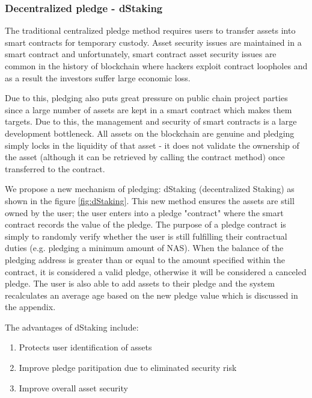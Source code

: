 \subsubsection{Decentralized pledge - dStaking}
The traditional centralized pledge method requires users to transfer assets into smart contracts for temporary custody. Asset security issues are maintained in a smart contract and unfortunately, smart contract asset security issues are common in the history of blockchain where hackers exploit contract loopholes and as a result the investors suffer large economic loss. 

Due to this, pledging also puts great pressure on public chain project parties since a large number of assets are kept in a smart contract which makes them targets. Due to this, the management and security of smart contracts is a large development bottleneck. All assets on the blockchain are genuine and pledging simply locks in the liquidity of that asset - it does not validate the ownership of the asset (although it can be retrieved by calling the contract method) once transferred to the contract.

We propose a new mechanism of pledging: dStaking (decentralized Staking) as shown in the figure \ref{fig:dStaking}. This new method ensures the assets are still owned by the user; the user enters into a pledge "contract" where the smart contract records the value of the pledge. The purpose of a pledge contract is simply to randomly verify whether the user is still fulfilling their contractual duties (e.g. pledging a minimum amount of NAS). When the balance of the pledging address is greater than or equal to the amount specified within the contract, it is considered a valid pledge, otherwise it will be considered a canceled pledge. The user is also able to add assets to their pledge and the system recalculates an average age based on the new pledge value which is discussed in the appendix.

The advantages of dStaking include:
\begin{enumerate}[\hspace{2cm}(a)]
    \item Protects user identification of assets
    \item Improve pledge paritipation due to eliminated security risk
    \item Improve overall asset security
\end{enumerate}

